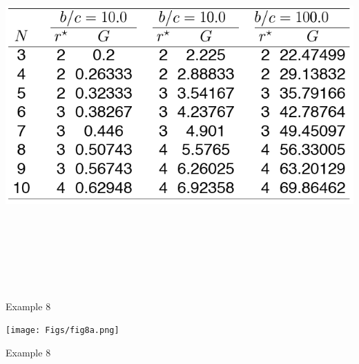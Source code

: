\documentclass[12pt]{article}
\newcommand{\headsize}{\fontsize{35}{35} \selectfont}
\begin{document}
\centerline{\includegraphics[height=5.5in]{Figs/tableB.png}}


\newpage


\headsize \color{myyellow}
\hfill \begin{minipage}{5.75in}
\centering
Example 8
\end{minipage}

\vspace{30mm}

\centerline{\texttt{[image: Figs/fig8a.png]}}


\newpage


\headsize \color{myyellow}
\hfill \begin{minipage}{5.75in}
\centering
Example 8
\end{minipage}

\vspace{30mm}
\end{document}
